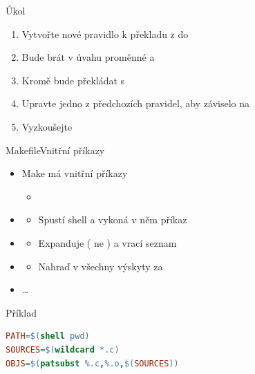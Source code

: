 \begin{frame}{Úkol}

  \begin{enumerate}
    \item Vytvořte nové pravidlo k překladu z  do 
    \item Bude brát v úvahu proměnné  a 
    \item Kromě  bude překládat s 
    \item Upravte jedno z předchozích  pravidel, aby záviselo na
    \item Vyzkoušejte
  \end{enumerate}

\end{frame}

\begin{frame}[fragile]{Makefile}{Vnitřní příkazy}

  \begin{itemize}
    \item Make má vnitřní příkazy
    \begin{itemize}
      \item {}
    \end{itemize}

    \pause

    \item {}
    \begin{itemize}
      \item Spustí shell a vykoná v něm příkaz 
    \end{itemize}

    \pause

    \item {}
    \begin{itemize}
      \item Expanduje  (\cmd{*} ne \cmd{\%}) a vrací seznam
    \end{itemize}

    \pause

    \item {}
    \begin{itemize}
      \item Nahraď v  všechny výskyty  za
    \end{itemize}

    \pause

    \item \dots
  \end{itemize}

  \begin{block}{Příklad}
  \begin{lstlisting}[language=make]
PATH=$(shell pwd)
SOURCES=$(wildcard *.c)
OBJS=$(patsubst %.c,%.o,$(SOURCES))
  \end{lstlisting} %
  \end{block}

\end{frame}

